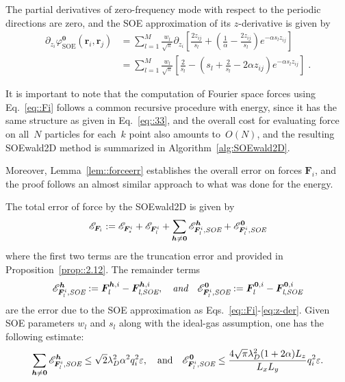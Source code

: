 The partial derivatives of zero-frequency mode with respect to the periodic directions are zero, and the SOE approximation of its $z$-derivative is given by
\begin{equation}\label{eq:dzphi_0}
	\begin{split}
		\partial_{z_{i}} \varphi^{\bm{0}}_{\text{SOE}}(\bm{r}_{i},\bm{r}_{j}) 
		& = \sum_{l=1}^{M} \frac{w_l}{\sqrt{\pi}} \partial_{z_{i}} \left[\frac{2z_{ij}}{s_l}+\left(\frac{1}{\alpha} - \frac{2z_{ij}}{s_l}\right)e^{-\alpha s_l z_{ij}}\right] \\
		& = \sum_{l=1}^{M} \frac{w_l}{\sqrt{\pi}} \left[ \frac{2}{s_l} - \left( s_l + \frac{2}{s_l} - 2 \alpha z_{ij} \right) e^{-\alpha s_l z_{ij}} \right]\;.
	\end{split}
\end{equation}

It is important to note that the computation of Fourier space forces using Eq.~\eqref{eq::Fi} follows a common recursive procedure with energy, since it has the same structure as given in Eq.~\eqref{eq::33}, and the overall cost for evaluating force on all~$N$ particles for each~$k$ point also amounts to~$O(N)$, and the resulting SOEwald2D method is summarized in Algorithm~\ref{alg:SOEwald2D}.

Moreover, Lemma~\ref{lem::forceerr} establishes the overall error on forces $\bm{F}_{i}$, and the proof follows an almost similar approach to what was done for the energy. %

\begin{lem}\label{lem::forceerr}
	The total error of force by the SOEwald2D is given by
	\begin{equation}
		\mathscr{E}_{\bm{F}_{i}} := \mathscr{E}_{\bm{F}_{\emph{s}}^{i}} + \mathscr{E}_{\bm{F}_{\emph{l}}^{i}} + \sum_{\bm{h}\neq \bm{0}} \mathscr{E}_{\bm{F}_{\emph{l}}^i, \emph{SOE}}^{\bm{h}} + \mathscr{E}_{\bm{F}_{\emph{l}}^{i},\emph{SOE}}^{\bm{0}}
	\end{equation}
	where the first two terms are the truncation error and provided in Proposition~\ref{prop::2.12}. The remainder terms 
	\begin{equation}
		\mathscr{E}_{\bm{F}_{\emph{l}}^i,\emph{SOE}}^{\bm{h}} := \bm{F}_{\emph{l}}^{\bm{h}, i} - \bm{F}_{\emph{l},\emph{SOE}}^{\bm{h}, i}, \quad\emph{and} \quad \mathscr{E}_{\bm{F}_{\emph{l}}^{i}, \emph{SOE}}^{\bm{0}} := \bm{F}_{\emph{l}}^{\bm{0}, i}-\bm{F}_{\emph{l}, \emph{SOE}}^{\bm{0}, i}
	\end{equation}
	are the error due to the SOE approximation as Eqs.~\eqref{eq::Fi}-\eqref{eq:z-der}. Given SOE parameters $w_l$ and $s_l$ along with the ideal-gas assumption, one has the following estimate:
	\begin{equation}
		\sum_{\bm{h}\neq\bm{0}} \mathscr{E}_{\bm{F}_{\emph{l}}^i, \emph{SOE}}^{ \bm{h}}\leq \sqrt{2}\lambda_D^2\alpha^2q_{i}^2\varepsilon,\quad\text{and}\quad \mathscr{E}_{\bm{F}_{\emph{l}}^{i},\emph{SOE}}^{\bm{0}}\leq \frac{4\sqrt{\pi}\lambda_D^2 (1+2\alpha)L_z}{L_xL_y}q_{i}^2\varepsilon.
	\end{equation}
\end{lem}



